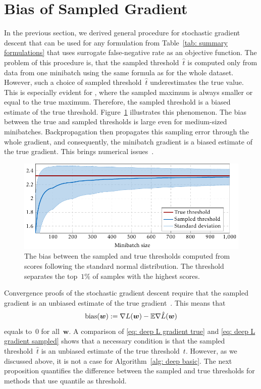 \section{Bias of Sampled Gradient}

In the previous section, we derived general procedure for stochastic gradient descent that can be used for any formulation from Table~\ref{tab: summary formulations} that uses surrogate false-negative rate as an objective function. The problem of this procedure is, that the sampled threshold~$\hat{t}$ is computed only from data from one minibatch using the same formula as for the whole dataset. However, such a choice of sampled threshold~$\hat{t}$ underestimates the true value. This is especially evident for \TopPush, where the sampled maximum is always smaller or equal to the true maximum. Therefore, the sampled threshold is a biased estimate of the true threshold. Figure~\ref{fig:thresholds1} illustrates this phenomenon. The bias between the true and sampled thresholds is large even for medium-sized minibatches. Backpropagation then propagates this sampling error through the whole gradient, and consequently, the minibatch gradient is a biased estimate of the true gradient. This brings numerical issues~\cite{bottou2018optimization}.

\begin{figure}
  \centering
  \includegraphics[width = \linewidth]{images/deep_threshold_bias.pdf}
  \caption{The bias between the sampled and true thresholds computed from scores following the standard normal distribution. The threshold separates the top~$1\%$ of samples with the highest scores.}
  \label{fig:thresholds1}
\end{figure}

Convergence proofs of the stochastic gradient descent require that the sampled gradient is an unbiased estimate of the true gradient~\cite{bottou2018optimization}. This means that
\begin{equation}\label{eq:defin_bias}
  \operatorname{bias}(\bm{w}) := \nabla L(\bm{w}) - \mathbb{E} \nabla \hat{L}(\bm{w})
\end{equation}
equals to~$0$ for all~$\bm{w}$. A comparison of \eqref{eq: deep L gradient true} and \eqref{eq: deep L gradient sampled} shows that a necessary condition is that the sampled threshold~$\hat{t}$ is an unbiased estimate of the true threshold~$t$. However, as we discussed above, it is not a case for Algorithm~\ref{alg: deep basic}. The next proposition quantifies the difference between the sampled and true thresholds for methods that use quantile as threshold.

